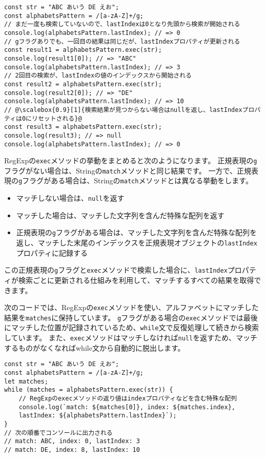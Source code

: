 \begin{tcolorbox}[enhanced jigsaw,breakable,title=RegExp.prototype.execでのString.prototype.matchAll]
\begin{lstlisting}[escapechar=\@]
const str = "ABC あいう DE えお";
const alphabetsPattern = /[a-zA-Z]+/g;
// まだ一度も検索していないので、lastIndexは0となり先頭から検索が開始される
console.log(alphabetsPattern.lastIndex); // => 0
// gフラグありでも、一回目の結果は同じだが、lastIndexプロパティが更新される
const result1 = alphabetsPattern.exec(str);
console.log(result1[0]); // => "ABC"
console.log(alphabetsPattern.lastIndex); // => 3
// 2回目の検索が、lastIndexの値のインデックスから開始される
const result2 = alphabetsPattern.exec(str);
console.log(result2[0]); // => "DE"
console.log(alphabetsPattern.lastIndex); // => 10
// @\scalebox{0.9}[1]{検索結果が見つからない場合はnullを返し、lastIndexプロパティは0にリセットされる}@
const result3 = alphabetsPattern.exec(str);
console.log(result3); // => null
console.log(alphabetsPattern.lastIndex); // => 0
\end{lstlisting}

RegExpの\texttt{exec}メソッドの挙動をまとめると次のようになります。
正規表現の\texttt{g}フラグがない場合は、Stringの\texttt{match}メソッドと同じ結果です。
一方で、正規表現の\texttt{g}フラグがある場合は、Stringの\texttt{match}メソッドとは異なる挙動をします。

\begin{itemize}
\item
  マッチしない場合は、\texttt{null}を返す
\item
  マッチした場合は、マッチした文字列を含んだ特殊な配列を返す
\item
  正規表現の\texttt{g}フラグがある場合は、マッチした文字列を含んだ特殊な配列を返し、マッチした末尾のインデックスを正規表現オブジェクトの\texttt{lastIndex}プロパティに記録する
\end{itemize}

この正規表現の\texttt{g}フラグと\texttt{exec}メソッドで検索した場合に、\texttt{lastIndex}プロパティが検索ごとに更新される仕組みを利用して、マッチするすべての結果を取得できます。

次のコードでは、RegExpの\texttt{exec}メソッドを使い、アルファベットにマッチした結果を\texttt{matches}に保持しています。
\texttt{g}フラグがある場合の\texttt{exec}メソッドでは最後にマッチした位置が記録されているため、\texttt{while}文で反復処理して続きから検索しています。
また、\texttt{exec}メソッドはマッチしなければ\texttt{null}を返すため、マッチするものがなくなればwhile文から自動的に脱出します。

\begin{lstlisting}
const str = "ABC あいう DE えお";
const alphabetsPattern = /[a-zA-Z]+/g;
let matches;
while (matches = alphabetsPattern.exec(str)) {
    // RegExpのexecメソッドの返り値はindexプロパティなどを含む特殊な配列
    console.log(`match: ${matches[0]}, index: ${matches.index}, 
    lastIndex: ${alphabetsPattern.lastIndex}`);
}
// 次の順番でコンソールに出力される
// match: ABC, index: 0, lastIndex: 3
// match: DE, index: 8, lastIndex: 10
\end{lstlisting}


\end{tcolorbox}
